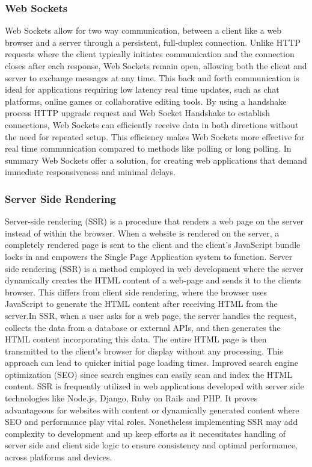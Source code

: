 \documentclass[a4paper,12pt]{article}  %
\begin{document}
\subsubsection{Web Sockets}
Web Sockets allow for two way communication, between a client like a web
browser and a server through a persistent, full-duplex connection. Unlike HTTP
requests where the client typically initiates communication and the connection
closes after each response, Web Sockets remain open, allowing both the client
and server to exchange messages at any time. This back and forth communication
is ideal for applications requiring low latency real time updates, such as chat
platforms, online games or collaborative editing tools. By using a handshake
process HTTP upgrade request and Web Socket Handshake to establish
connections, Web Sockets can efficiently receive data in both directions
without the need for repeated setup. This efficiency makes Web Sockets more
effective for real time communication compared to methods like polling or long
polling. In summary Web Sockets offer a solution, for creating web applications
that demand immediate responsiveness and minimal delays.\\

\subsubsection{Server Side Rendering}
Server-side rendering (SSR) is a procedure that renders a web page on the
server instead of within the browser. When a website is rendered on the server,
a completely rendered page is sent to the client and the client's JavaScript
bundle locks in and empowers the Single Page Application system to function.
Server side rendering (SSR) is a method employed in web development where the
server dynamically creates the HTML content of a web-page and sends it to the
clients browser. This differs from client side rendering, where the browser
uses JavaScript to generate the HTML content after receiving HTML from the
server.In SSR, when a user asks for a web page, the server handles the request,
collects the data from a database or external APIs, and then generates the HTML
content incorporating this data. The entire HTML page is then transmitted to
the client's browser for display without any processing. This approach can lead
to quicker initial page loading times. Improved search engine optimization
(SEO) since search engines can easily scan and index the HTML content. SSR is
frequently utilized in web applications developed with server side technologies
like Node.js, Django, Ruby on Rails and PHP. It proves advantageous for
websites with content or dynamically generated content where SEO and
performance play vital roles. Nonetheless implementing SSR may add complexity
to development and up keep efforts as it necessitates handling of server side
and client side logic to ensure consistency and optimal performance, across
platforms and devices.\\
\end{document}
